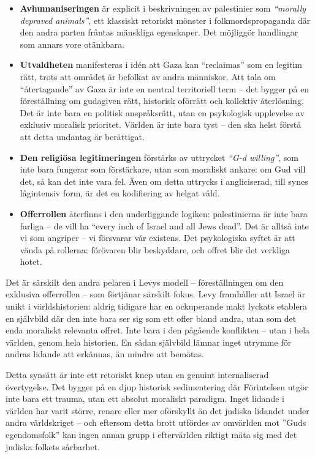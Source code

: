 \begin{itemize}
    \item \textbf{Avhumaniseringen} är explicit i beskrivningen av palestinier som \textit{“morally depraved animals”}, ett klassiskt retoriskt mönster i folkmordspropaganda där den andra parten fråntas mänskliga egenskaper. Det möjliggör handlingar som annars vore otänkbara.
    
    \item \textbf{Utvaldheten} manifesteras i idén att Gaza kan “reclaimas” som en legitim rätt, trots att området är befolkat av andra människor. Att tala om “återtagande” av Gaza är inte en neutral territoriell term – det bygger på en föreställning om gudagiven rätt, historisk oförrätt och kollektiv återlösning. Det är inte bara en politisk anspråksrätt, utan en psykologisk upplevelse av exklusiv moralisk prioritet. Världen är inte bara tyst – den ska helst förstå att detta undantag är berättigat.

    \item \textbf{Den religiösa legitimeringen} förstärks av uttrycket \textit{“G-d willing”}, som inte bara fungerar som förstärkare, utan som moraliskt ankare: om Gud vill det, så kan det inte vara fel. Även om detta uttrycks i angliciserad, till synes lågintensiv form, är det en kodifiering av helgat våld.

    \item \textbf{Offerrollen} återfinns i den underliggande logiken: palestinierna är inte bara farliga – de vill ha “every inch of Israel and all Jews dead”. Det är alltså inte vi som angriper – vi försvarar vår existens. Det psykologiska syftet är att vända på rollerna: förövaren blir beskyddare, och offret blir det verkliga hotet.
\end{itemize}

Det är särskilt den andra pelaren i Levys modell – föreställningen om den exklusiva offerrollen – som förtjänar särskilt fokus. Levy framhåller att Israel är unikt i världshistorien: aldrig tidigare har en ockuperande makt lyckats etablera en självbild där den inte bara ser sig som ett offer bland andra, utan som det enda moraliskt relevanta offret. Inte bara i den pågående konflikten – utan i hela världen, genom hela historien. En sådan självbild lämnar inget utrymme för andras lidande att erkännas, än mindre att bemötas.


Detta synsätt är inte ett retoriskt knep utan en genuint internaliserad övertygelse. Det bygger på en djup historisk sedimentering där Förintelsen utgör inte bara ett trauma, utan ett absolut moraliskt paradigm. Inget lidande i världen har varit större, renare eller mer oförskyllt än det judiska lidandet under andra världskriget – och eftersom detta brott utfördes av omvärlden mot ”Guds egendomsfolk” kan ingen annan grupp i eftervärlden riktigt mäta sig med det judiska folkets sårbarhet. 

